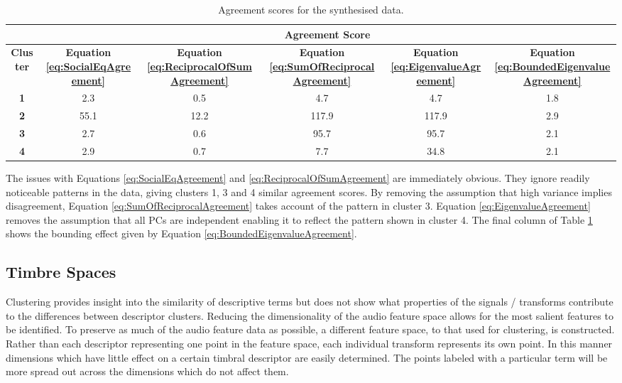 			\begin{table}[h!]
				\centering
				\begin{tabular}{|c|c|c|c|c|c|}
					\cline{2-6}
					\multicolumn{1}{c|}{} & \multicolumn{5}{c|}{\bf{Agreement Score}} \tabularnewline
					\hline
					\bf{Cluster} & \bf{Equation \ref{eq:SocialEqAgreement}} & 
					\bf{Equation \ref{eq:ReciprocalOfSumAgreement}} &
					\bf{Equation \ref{eq:SumOfReciprocalAgreement}} & 
					\bf{Equation \ref{eq:EigenvalueAgreement}} &
					\bf{Equation \ref{eq:BoundedEigenvalueAgreement}} \tabularnewline
					\hline
					\hline
					\bf{1} & 2.3 & 0.5 & 4.7 & 4.7 & 1.8 \tabularnewline
					\hline
					\bf{2} & 55.1 & 12.2 & 117.9 & 117.9 & 2.9 \tabularnewline
					\hline
					\bf{3} & 2.7 & 0.6 & 95.7 & 95.7 & 2.1 \tabularnewline
					\hline
					\bf{4} & 2.9 & 0.7 & 7.7 & 34.8 & 2.1 \tabularnewline
					\hline
				\end{tabular}
				\caption{Agreement scores for the synthesised data.}
				\label{tab:SynthesisedDataAgreement}
			\end{table}

			The issues with Equations \ref{eq:SocialEqAgreement} and \ref{eq:ReciprocalOfSumAgreement} are
			immediately obvious. They ignore readily noticeable patterns in the data, giving clusters 1, 3 and
			4 similar agreement scores. By removing the assumption that high variance implies disagreement,
			Equation \ref{eq:SumOfReciprocalAgreement} takes account of the pattern in cluster 3. Equation
			\ref{eq:EigenvalueAgreement} removes the assumption that all PCs are independent enabling it to
			reflect the pattern shown in cluster 4. The final column of Table
			\ref{tab:SynthesisedDataAgreement} shows the bounding effect given by Equation
			\ref{eq:BoundedEigenvalueAgreement}.

	\subsection{Timbre Spaces}
	\label{sec:TimbreEvaluation-Analysis-TimbreSpaces}
		Clustering provides insight into the similarity of descriptive terms but does not show what properties of
		the signals / transforms contribute to the differences between descriptor clusters. Reducing the
		dimensionality of the audio feature space allows for the most salient features to be identified. To
		preserve as much of the audio feature data as possible, a different feature space, to that used for
		clustering, is constructed. Rather than each descriptor representing one point in the feature space, each
		individual transform represents its own point. In this manner dimensions which have little effect on a
		certain timbral descriptor are easily determined. The points labeled with a particular term will be more
		spread out across the dimensions which do not affect them. 
		

